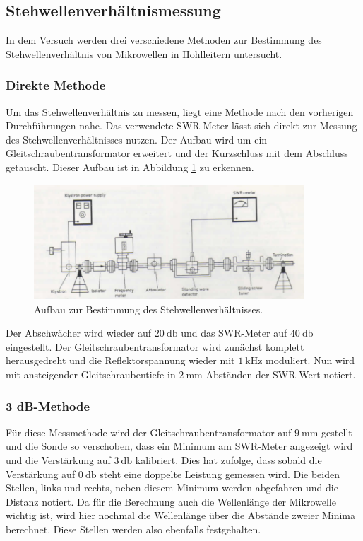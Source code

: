 \subsection{Stehwellenverhältnismessung}
In dem Versuch werden drei verschiedene Methoden zur Bestimmung des Stehwellenverhältnis von Mikrowellen in Hohlleitern untersucht.

\subsubsection{Direkte Methode}
Um das Stehwellenverhältnis zu messen, liegt eine Methode nach den vorherigen Durchführungen nahe. Das verwendete SWR-Meter lässt sich direkt zur Messung des Stehwellenverhältnisses nutzen. Der Aufbau wird um ein Gleitschraubentransformator erweitert
und der Kurzschluss mit dem Abschluss getauscht. Dieser Aufbau ist in Abbildung \ref{fig:3} zu erkennen. 

\begin{figure}
    \centering
    \includegraphics[width=0.9\textwidth]{Bilder/aufbau3.png}
    \caption{Aufbau zur Bestimmung des Stehwellenverhältnisses. \cite{skript}} 
    \label{fig:3}
\end{figure}
Der Abschwächer wird wieder auf $\SI{20}{\decibel}$ und das SWR-Meter auf $\SI{40}{\decibel}$ eingestellt. Der Gleitschraubentransformator wird zunächst komplett herausgedreht und die Reflektorspannung wieder mit $\SI{1}{\kilo\hertz}$ moduliert.
Nun wird mit ansteigender Gleitschraubentiefe in $\SI{2}{\milli\meter}$ Abständen der SWR-Wert notiert.

\subsubsection{3 dB-Methode}
Für diese Messmethode wird der Gleitschraubentransformator auf $\SI{9}{\milli\meter}$ gestellt und die Sonde so verschoben, dass ein Minimum am SWR-Meter angezeigt wird und die Verstärkung auf $\SI{3}{\decibel}$ kalibriert.  Dies hat zufolge, dass 
sobald die Verstärkung auf $\SI{0}{\decibel}$ steht eine doppelte Leistung gemessen wird. Die beiden Stellen, links und rechts, neben diesem Minimum werden abgefahren und die Distanz notiert. Da für die Berechnung auch die
Wellenlänge der Mikrowelle wichtig ist, wird hier nochmal die Wellenlänge über die Abstände zweier Minima berechnet. Diese Stellen werden also ebenfalls festgehalten.

